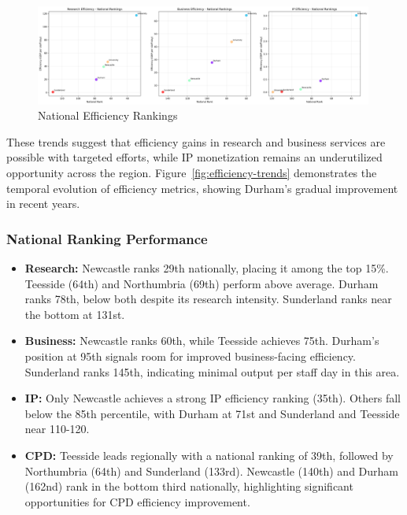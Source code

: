 \documentclass[journal,onecolumn, 10pt,draftclsnofoot]{IEEEtran}
\begin{document}
\begin{figure}[h]
\centering
\includegraphics[width=0.99\textwidth]{Fig/figure40.national_efficiency_rankings.png}
\caption{National Efficiency Rankings}
\label{fig:national-efficiency-rankings}
\end{figure}

These trends suggest that efficiency gains in research and business services are possible with targeted efforts, while IP monetization remains an underutilized opportunity across the region. Figure~\ref{fig:efficiency-trends} demonstrates the temporal evolution of efficiency metrics, showing Durham's gradual improvement in recent years.

\subsubsection{National Ranking Performance}

\begin{itemize}
    \item \textbf{Research:} Newcastle ranks 29th nationally, placing it among the top 15\%. Teesside (64th) and Northumbria (69th) perform above average. Durham ranks 78th, below both despite its research intensity. Sunderland ranks near the bottom at 131st.
    
    \item \textbf{Business:} Newcastle ranks 60th, while Teesside achieves 75th. Durham's position at 95th signals room for improved business-facing efficiency. Sunderland ranks 145th, indicating minimal output per staff day in this area.
    
    \item \textbf{IP:} Only Newcastle achieves a strong IP efficiency ranking (35th). Others fall below the 85th percentile, with Durham at 71st and Sunderland and Teesside near 110-120.
    
    \item \textbf{CPD:} Teesside leads regionally with a national ranking of 39th, followed by Northumbria (64th) and Sunderland (133rd). Newcastle (140th) and Durham (162nd) rank in the bottom third nationally, highlighting significant opportunities for CPD efficiency improvement.
\end{itemize}
\end{document}
